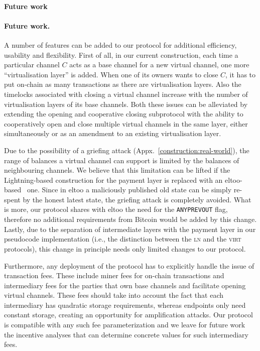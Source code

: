 \makeatletter%
%
  {\paragraph{Future work}}%
  {\paragraph{Future work.}}%
\makeatother%
  A number of features can be added to our protocol for additional efficiency,
  usability and flexibility. First of all, in our current construction, each
  time a particular channel $C$ acts as a base
  channel for a new virtual channel, one more ``virtualisation layer'' is added. When
  one of its owners wants to close $C$, it has to put on-chain as many
  transactions as there are virtualisation layers. Also the timelocks associated
  with closing a virtual channel increase with the number of virtualisation
  layers of its base channels. Both these issues can be alleviated by extending
  the opening and cooperative closing subprotocol with the ability to
  cooperatively open and close multiple virtual channels in the same layer,
  either simultaneously or as an amendment to an existing virtualisation layer.

  Due to the possibility of a griefing attack
  (Appx.~\ref{construction:real-world}), the range of balances a virtual
  channel can
  support is limited by the balances of neighbouring channels. We believe that
  this limitation can be lifted if the Lightning-based
  construction for the payment layer is replaced with an
  eltoo-based~\cite{eltoo} one. Since in eltoo a maliciously published
  old state can be simply re-spent by the honest latest state, the griefing
  attack is completely avoided. What is more, our protocol shares with eltoo the
  need for the \texttt{ANYPREVOUT} flag, therefore no additional
  requirements from Bitcoin would be added by this change. Lastly,
  due to the separation of intermediate layers with the payment layer in our
  pseudocode implementation (i.e., the distinction
  between the \textsc{ln} and the \textsc{virt} protocols), this change
  in principle needs only limited changes to our protocol.

  Furthermore, any deployment of the protocol has to explicitly handle the issue
  of transaction fees. These include miner fees for on-chain transactions and
  intermediary fees for the parties that own base channels and facilitate
  opening virtual channels. These fees should take into account the fact that
  each intermediary has quadratic storage requirements, whereas endpoints only
  need constant storage, creating an opportunity for amplification attacks. Our
  protocol is compatible with any such fee parameterization and we leave for
  future work the incentive analyses that can determine concrete values for such
  intermediary fees.

